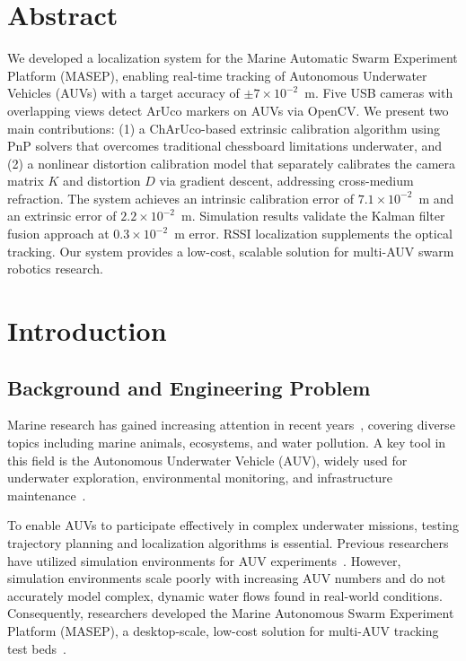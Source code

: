 \documentclass[11pt]{article}
\begin{document}
\newpage
\section*{Abstract}
We developed a localization system for the Marine Automatic Swarm Experiment Platform (MASEP), enabling real-time tracking of Autonomous Underwater Vehicles (AUVs) with a target accuracy of $\pm 7\times 10^{-2}$~m. Five USB cameras with overlapping views detect ArUco markers on AUVs via OpenCV. We present two main contributions: (1) a ChArUco-based extrinsic calibration algorithm using PnP solvers that overcomes traditional chessboard limitations underwater, and (2) a nonlinear distortion calibration model that separately calibrates the camera matrix $K$ and distortion $D$ via gradient descent, addressing cross-medium refraction. The system achieves an intrinsic calibration error of $7.1\times 10^{-2}$~m and an extrinsic error of $2.2\times 10^{-2}$~m. Simulation results validate the Kalman filter fusion approach at $0.3\times 10^{-2}$~m error. RSSI localization supplements the optical tracking. Our system provides a low-cost, scalable solution for multi-AUV swarm robotics research.

\newpage
\setcounter{page}{1}
\pagestyle{fancy}
\fancyhf{}
\fancyfoot[R]{\thepage}
\section{Introduction}
    \subsection{Background and Engineering Problem } 
        Marine research has gained increasing attention in recent years~\cite{pedersen_camera_2018}, covering diverse topics including marine animals, ecosystems, and water pollution. A key tool in this field is the Autonomous Underwater Vehicle (AUV), widely used for underwater exploration, environmental monitoring, and infrastructure maintenance~\cite{cai_data-driven_2025, zhou_survey_2022}.

        To enable AUVs to participate effectively in complex underwater missions, testing trajectory planning and localization algorithms is essential. Previous researchers have utilized simulation environments for AUV experiments~\cite{agrawal_underwater_2025}. However, simulation environments scale poorly with increasing AUV numbers and do not accurately model complex, dynamic water flows found in real-world conditions. Consequently, researchers developed the Marine Autonomous Swarm Experiment Platform (MASEP), a desktop-scale, low-cost solution for multi-AUV tracking test beds~\cite{cai_development_2024}.
\end{document}
